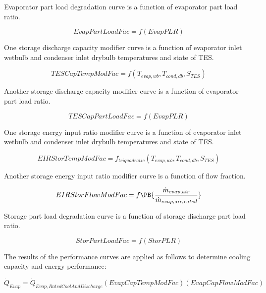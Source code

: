 Evaporator part load degradation curve is a function of evaporator part load ratio.

\begin{equation}
EvapPartLoadFac = f\left( {EvapPLR} \right)
\end{equation}

One storage discharge capacity modifier curve is a function of evaporator inlet wetbulb and condenser inlet drybulb temperatures and state of TES.

\begin{equation}
TESCapTempModFac = f\left( {{T_{evap,wb}},{T_{cond,db}},{S_{TES}}} \right)
\end{equation}

Another storage discharge capacity modifier curve is a function of evaporator part load ratio.

\begin{equation}
TESCapPartLoadFac = f\left( {EvapPLR} \right)
\end{equation}

One storage energy input ratio modifier curve is a function of evaporator inlet wetbulb and condenser inlet drybulb temperatures and state of TES.

\begin{equation}
EIRStorTempModFac = {f_{triquadratic}}\left( {{T_{evap,wb}},{T_{cond,db}},{S_{TES}}} \right)
\end{equation}

Another storage energy input ratio modifier curve is a function of flow fraction.

\begin{equation}
  EIRStorFlowModFac = f\PB{\frac{\dot{m}_{evap,air}}{\dot{m}_{evap,air,rated}}}
\end{equation}

Storage part load degradation curve is a function of storage discharge part load ratio.

\begin{equation}
StorPartLoadFac = f\left( {StorPLR} \right)
\end{equation}

The results of the performance curves are applied as follows to determine cooling capacity and energy performance:

\begin{equation}
{\dot Q_{Evap}} = {\dot Q_{Evap,RatedCoolAndDischarge}}\left( {EvapCapTempModFac} \right)\left( {EvapCapFlowModFac} \right)
\end{equation}

